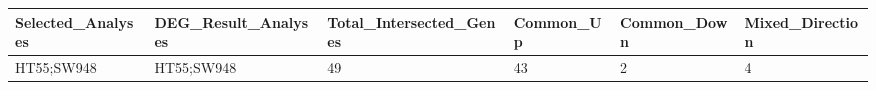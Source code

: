 \begingroup
\tiny
\setlength{\tabcolsep}{2pt}
\renewcommand{\arraystretch}{1.18}
\begin{tabular}{@{}llllll@{}}
\toprule
Selected\_Analyses & DEG\_Result\_Analyses & Total\_Intersected\_Genes & Common\_Up & Common\_Down & Mixed\_Direction \\
\midrule
HT55;SW948 & HT55;SW948 & 49 & 43 & 2 & 4 \\
\bottomrule
\end{tabular}
\endgroup
